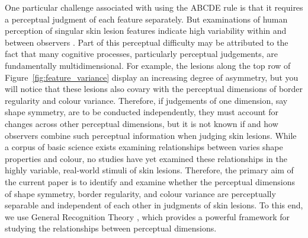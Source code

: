 \documentclass[man, 12pt, a4paper,  donotrepeattitle, floatsintext, draftfirst]{apa7}
\begin{document}
One particular challenge associated with using the ABCDE rule is that it requires a perceptual judgment of each feature separately.
But examinations of human perception of singular skin lesion features indicate high variability within and between observers \parencite{gunasti2008interrater,branstrom2002laypersons}.
Part of this perceptual difficulty may be attributed to the fact that many cognitive processes, particularly perceptual judgements, are fundamentally multidimensional.
For example, the lesions along the top row of Figure~\ref{fig:feature_variance} display an increasing degree of asymmetry, but you will notice that these lesions also covary with the perceptual dimensions of border regularity and colour variance.
Therefore, if judgements of one dimension, say shape symmetry, are to be conducted independently, they must account for changes across other perceptual dimensions, but it is not known if and how observers combine such perceptual information when judging skin lesions.
While a corpus of basic science exists examining relationships between varies shape properties and colour, no studies have yet examined these relationships in the highly variable, real-world stimuli of skin lesions.
Therefore, the primary aim of the current paper is to identify and examine whether the perceptual dimensions of shape symmetry, border regularity, and colour variance are perceptually separable and independent of each other in judgments of skin lesions.
To this end, we use General Recognition Theory \parencite[GRT; ][]{ashby1986varieties}, which provides a powerful framework for studying the relationships between perceptual dimensions.

\end{document}

